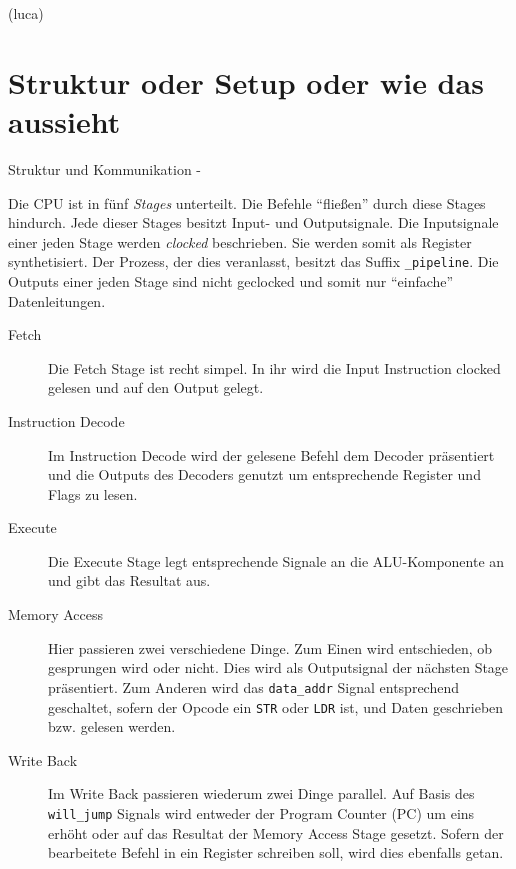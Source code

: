 \documentclass[paper=a4,fontsize=12pt,twocolumn]{scrreprt}
\begin{document}
(luca)
\section{Struktur oder Setup oder wie das aussieht}
Struktur und Kommunikation -


Die CPU ist in fünf \textit{Stages} unterteilt.
Die Befehle \enquote{fließen} durch diese Stages hindurch.
Jede dieser Stages besitzt Input- und Outputsignale.
Die Inputsignale einer jeden Stage werden \textit{clocked} beschrieben.
Sie werden somit als Register synthetisiert.
Der Prozess, der dies veranlasst, besitzt das Suffix \texttt{\_pipeline}.
Die Outputs einer jeden Stage sind nicht geclocked und somit nur \enquote{einfache} Datenleitungen.

\begin{description}
  \item[Fetch]
  Die Fetch Stage ist recht simpel.
  In ihr wird die Input Instruction clocked gelesen und auf den Output gelegt.
  \item[Instruction Decode]
  Im Instruction Decode wird der gelesene Befehl dem Decoder präsentiert und die Outputs des Decoders genutzt um entsprechende Register und Flags zu lesen.
  \item[Execute]
  Die Execute Stage legt entsprechende Signale an die ALU-Komponente an und gibt das Resultat aus.
  \item[Memory Access]
  Hier passieren zwei verschiedene Dinge.
  Zum Einen wird entschieden, ob gesprungen wird oder nicht.
  Dies wird als Outputsignal der nächsten Stage präsentiert.
  Zum Anderen wird das \texttt{data\_addr} Signal entsprechend geschaltet, sofern der Opcode ein \texttt{STR} oder \texttt{LDR} ist, und Daten geschrieben bzw. gelesen werden.
  \item[Write Back]
  Im Write Back passieren wiederum zwei Dinge parallel.
  Auf Basis des \texttt{will\_jump} Signals wird entweder der Program Counter (PC) um eins erhöht oder auf das Resultat der Memory Access Stage gesetzt.
  Sofern der bearbeitete Befehl in ein Register schreiben soll, wird dies ebenfalls getan.
\end{description}
\end{document}
